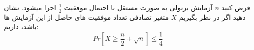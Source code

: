 \problem{}
فرض کنید $n$ آزمایش برنولی به صورت مستقل با احتمال موفقیت $\frac{1}{2}$
اجرا میشود.
نشان دهید اگر در نظر بگیریم $X$ متغیر تصادفی تعداد موفقیت های 
حاصل از این آزمایش ها باشد، داریم:\\
\[ Pr[X \geq \frac{n}{2} + \sqrt{n}] \leq \frac{1}{4}\]